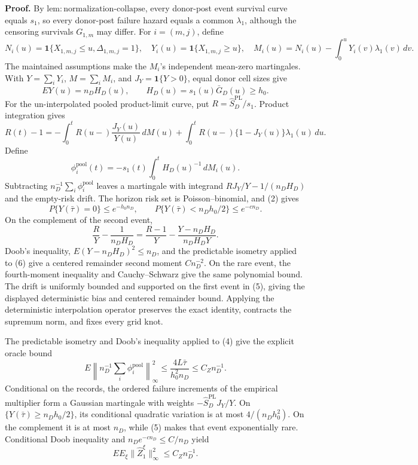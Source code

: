 \textbf{Proof.}
By \(\mathrm{lem:normalization\mbox{-}collapse}\), every donor-post event survival curve equals \(s_1\), so every donor-post failure hazard equals a common \(\lambda_1\), although the censoring survivals \(G_{1,m}\) may differ. For \(i=(m,j)\), define
\[
 N_i(u)=\mathbf1\{X_{1,m,j}\le u,\Delta_{1,m,j}=1\},
 \quad Y_i(u)=\mathbf1\{X_{1,m,j}\ge u\},
 \quad M_i(u)=N_i(u)-\int_0^uY_i(v)\lambda_1(v)\,dv.      \tag{1}
\]
The maintained assumptions make the \(M_i\)'s independent mean-zero martingales. With \(Y=\sum_iY_i\), \(M=\sum_iM_i\), and \(J_Y=\mathbf1\{Y>0\}\), equal donor cell sizes give
\[
 EY(u)=n_DH_D(u),\qquad H_D(u)=s_1(u)\bar G_D(u)\ge h_0.  \tag{2}
\]
For the un-interpolated pooled product-limit curve, put \(R=\widehat S_D^{\mathrm{PL}}/s_1\). Product integration gives
\[
 R(t)-1=-\int_0^tR(u-)\frac{J_Y(u)}{Y(u)}\,dM(u)
 +\int_0^tR(u-)\{1-J_Y(u)\}\lambda_1(u)\,du.             \tag{3}
\]
Define
\[
 \phi_i^{\mathrm{pool}}(t)
 =-s_1(t)\int_0^tH_D(u)^{-1}\,dM_i(u).                   \tag{4}
\]
Subtracting \(n_D^{-1}\sum_i\phi_i^{\mathrm{pool}}\) leaves a martingale with integrand \(RJ_Y/Y-1/(n_DH_D)\) and the empty-risk drift. The horizon risk set is Poisson--binomial, and (2) gives
\[
 P\{Y(\bar\tau)=0\}\le e^{-h_0n_D},
 \qquad P\{Y(\bar\tau)<n_Dh_0/2\}\le e^{-cn_D}.         \tag{5}
\]
On the complement of the second event,
\[
 \frac{R}{Y}-\frac1{n_DH_D}
 =\frac{R-1}{Y}-\frac{Y-n_DH_D}{n_DH_DY}.                 \tag{6}
\]
Doob's inequality, \(E(Y-n_DH_D)^2\le n_D\), and the predictable isometry applied to (6) give a centered remainder second moment \(Cn_D^{-2}\). On the rare event, the fourth-moment inequality and Cauchy--Schwarz give the same polynomial bound. The drift is uniformly bounded and supported on the first event in (5), giving the displayed deterministic bias and centered remainder bound. Applying the deterministic interpolation operator preserves the exact identity, contracts the supremum norm, and fixes every grid knot.

The predictable isometry and Doob's inequality applied to (4) give the explicit oracle bound
\[
 E\left\|n_D^{-1}\sum_i\phi_i^{\mathrm{pool}}\right\|_\infty^2
 \le \frac{4L\bar\tau}{h_0^2n_D}
 \le C_Zn_D^{-1}.                                       \tag{7}
\]
Conditional on the records, the ordered failure increments of the empirical multiplier form a Gaussian martingale with weights \(-\widehat S_D^{\mathrm{PL}}J_Y/Y\). On \(\{Y(\bar\tau)\ge n_Dh_0/2\}\), its conditional quadratic variation is at most \(4/(n_Dh_0^2)\). On the complement it is at most \(n_D\), while (5) makes that event exponentially rare. Conditional Doob inequality and \(n_De^{-cn_D}\le C/n_D\) yield
\[
 E E_\xi\|\widehat Z_1^\xi\|_\infty^2
 \le C_Zn_D^{-1}.                                       \tag{8}
\]

